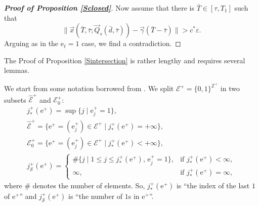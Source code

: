 \documentclass[10pt]{article}
\numberwithin{equation}{section}
\def\ga{\vec{\gamma}}
\def\ep{\varepsilon}
\def\Z{{\mathbb Z}}
\def\ee{{\mathrm e}}
\def\EE{{\mathcal E}}
\def\SS{{\mathcal S}}
\def\Q{\vec{Q}}
\def\x{\vec{x}}
\theoremstyle{definition}
\theoremstyle{remark}
\begin{document}
\begin{proof}[\textbf{Proof of Proposition \ref{Sclosed}}]
Now assume that there is $\bar{T} \in [\tau, T_1]$ such that $$\|\x( \bar{T},\bar{\tau}; \Q_s(\bar{d},\bar{\tau}))-
\ga(\bar{T}-\bar{\tau}) \| >  c^*\ep
.$$
Arguing as in the $\ee_\ell=1$ case, we
 find a contradiction.
\end{proof}


The Proof of Proposition \ref{Sintersection} is  rather lengthy and requires several lemmas.

We start from some notation borrowed from \cite{CFPrestate}.
We split $\EE^+= \{0,1\} ^{\Z^+}$ in two subsets $\hat{\EE}^+$ and $\EE^+_0$:
 \begin{equation}\label{efuture}
 \begin{array}{c}
   j^+_*(\ee^+)=\sup\{ j \mid \ee^+_j=1  \},\\
\hat{\EE}^+= \{ \ee^+=(\ee^+_j) \in \EE^+ \mid j^+_*(\ee^+)= +\infty \} ,\\
\EE^+_0= \{ \ee^+=(\ee^+_j) \in \EE^+ \mid  j^+_*(\ee^+)< +\infty \},\\
 j_\SS^+(\ee^+)=\begin{cases}\#\{j\mid 1\leq j\leq j^+_*(\ee^+),\,\ee_j^+=1\},&\text{if }j^+_*(\ee^+)<\infty,\\ \infty,& \text{if }
j^+_*(\ee^+)=\infty,\end{cases}
\end{array}
\end{equation}
 where $\#$ denotes the number of elements. So, $j^+_*(\ee^+)$ is ``the index of the last $1$ of $\ee^+$'' and $j_\SS^+(\ee^+)$ is
``the number of $1$s in $\ee^+$''.
\end{document}

